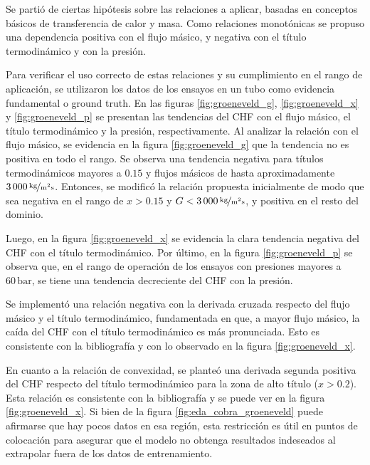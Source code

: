 Se partió de ciertas hipótesis sobre las relaciones a aplicar, basadas en conceptos básicos de transferencia de calor y masa. Como relaciones monotónicas se propuso una dependencia positiva con el flujo másico, y negativa con el título termodinámico y con la presión. 

Para verificar el uso correcto de estas relaciones y su cumplimiento en el rango de aplicación, se utilizaron los datos de los ensayos en un tubo como evidencia fundamental o ground truth. En las figuras \ref{fig:groeneveld_g}, \ref{fig:groeneveld_x} y \ref{fig:groeneveld_p} se presentan las tendencias del CHF con el flujo másico, el título termodinámico y la presión, respectivamente. 
Al analizar la relación con el flujo másico, se evidencia en la figura \ref{fig:groeneveld_g} que la tendencia no es positiva en todo el rango. Se observa una tendencia negativa para títulos termodinámicos mayores a $0.15$ y flujos másicos de hasta aproximadamente $3\,000\,\nicefrac{\mathrm{kg}}{\mathrm{m}^2\mathrm{s}}$.
Entonces, se modificó la relación propuesta inicialmente de modo que sea negativa en el rango de $x>0.15$ y $G<3\,000\,\nicefrac{\mathrm{kg}}{\mathrm{m}^2\mathrm{s}}$, y positiva en el resto del dominio.

Luego, en la figura \ref{fig:groeneveld_x} se evidencia la clara tendencia negativa del CHF con el título termodinámico.
Por último, en la figura \ref{fig:groeneveld_p} se observa que, en el rango de operación de los ensayos con presiones mayores a $60\,\mathrm{bar}$, se tiene una tendencia decreciente del CHF con la presión. 


Se implementó una relación negativa con la derivada cruzada respecto del flujo másico y el título termodinámico, fundamentada en que, a mayor flujo másico, la caída del CHF con el título termodinámico es más pronunciada. Esto es consistente con la bibliografía y con lo observado en la figura \ref{fig:groeneveld_x}.

En cuanto a la relación de convexidad, se planteó una derivada segunda positiva del CHF respecto del título termodinámico para la zona de alto título ($x>0.2$). Esta relación es consistente con la bibliografía y se puede ver en la figura \ref{fig:groeneveld_x}. Si bien de la figura \ref{fig:eda_cobra_groeneveld} puede afirmarse que hay pocos datos en esa región, esta restricción es útil en puntos de colocación para asegurar que el modelo no obtenga resultados indeseados al extrapolar fuera de los datos de entrenamiento.


